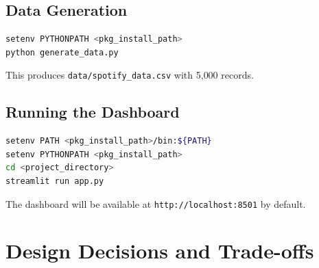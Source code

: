 \documentclass[12pt,a4paper]{article}
\begin{document}
\subsection{Data Generation}

\begin{lstlisting}[language=bash, style=pythonstyle, caption={Generate synthetic dataset}]
setenv PYTHONPATH <pkg_install_path>
python generate_data.py
\end{lstlisting}

This produces \texttt{data/spotify\_data.csv} with 5{,}000 records.

\subsection{Running the Dashboard}

\begin{lstlisting}[language=bash, style=pythonstyle, caption={Launch the dashboard}]
setenv PATH <pkg_install_path>/bin:${PATH}
setenv PYTHONPATH <pkg_install_path>
cd <project_directory>
streamlit run app.py
\end{lstlisting}

The dashboard will be available at \texttt{http://localhost:8501} by default.

\section{Design Decisions and Trade-offs}
\end{document}
